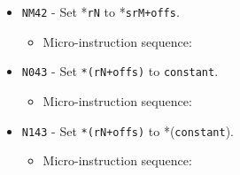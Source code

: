 \documentclass{article}
\def\pkptrout{\Verb|0202| - output *\Verb|pk| to data bus}
\def\tmpatodata{\Verb|2002| - output \Verb|tmpA| to data bus}
\def\tmpaptodata{\Verb|2202| - output *\Verb|tmpA| to data bus}
\def\datatotmpa{\Verb|2402| - write to \Verb|tmpA| from data bus}
\def\datatooffs{\Verb|4402| - write to \Verb|offs| from data bus}
\def\incrementpk{\Verb|0502| - increment \Verb|pk|}
\def\regtoaddr#1{\Verb|#1103| - output \Verb|r#1| to addr bus}
\def\regptodatao#1{\Verb|#1303| - output *(\Verb|r#1|+\Verb|offs|) to data bus}
\def\writeRAM{\Verb|0004| - write data bus to *(addr bus)}
\def\echodatalong{\Verb|0025| - echo data bus to itself for 3 cycles}
\def\done{\Verb|fffe| - end instruction}
\begin{document}
\begin{itemize}
    \item \Verb|NM42| - Set *\Verb|rN| to *\Verb|srM+offs|.
    \begin{itemize}
        \item Micro-instruction sequence:
    \end{itemize}

    \item \Verb|N043| - Set \Verb|*(rN+offs)| to \Verb|constant|.
    \begin{itemize}
        \item Micro-instruction sequence:
    \end{itemize}
    
    \item \Verb|N143| - Set \Verb|*(rN+offs)| to *(\Verb|constant|).
    \begin{itemize}
        \item Micro-instruction sequence:
    \end{itemize}
    

\end{itemize}
\end{document}
